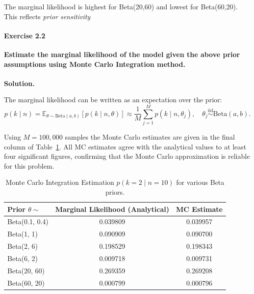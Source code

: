 \documentclass[12pt]{scrartcl}
\begin{document}
The marginal likelihood is highest for Beta(20,60) and lowest for Beta(60,20). This reflects \textit{prior sensitivity}

\paragraph*{Exercise 2.2} \textbf{Estimate the marginal likelihood of the model given the above prior assumptions using Monte
Carlo Integration method.}
\\ \\
\textbf{Solution.}

The marginal likelihood can be written as an expectation over the prior:
\[
  p(k \mid n) = \mathbb{E}_{\theta \sim \text{Beta}(a,b)}\!\left[p(k \mid n, \theta)\right] \approx \frac{1}{M}\sum_{j=1}^{M} p(k \mid n, \theta_j), \quad \theta_j \overset{\text{iid}}{\sim} \text{Beta}(a,b).
\]

Using $M = 100{,}000$ samples the Monte Carlo estimates are given in the final column of Table~\ref{tab:ml}. All MC estimates agree with the analytical values to at least four significant figures, confirming that the Monte Carlo approximation is reliable for this problem.

\begin{table}[H]
\centering
\caption{Monte Carlo Integration Estimation $p(k=2 \mid n=10)$ for various Beta priors.}
\label{tab:ml}
\begin{tabular}{lcc}
\toprule
Prior $\theta \sim $ & Marginal Likelihood (Analytical) & MC Estimate \\
\midrule
Beta(0.1, 0.4) & 0.039809 & 0.039957 \\
Beta(1, 1)     & 0.090909 & 0.090700 \\
Beta(2, 6)     & 0.198529 & 0.198343 \\
Beta(6, 2)     & 0.009718 & 0.009731 \\
Beta(20, 60)   & 0.269359 & 0.269208 \\
Beta(60, 20)   & 0.000799 & 0.000796 \\
\bottomrule
\end{tabular}
\end{table}
\end{document}
